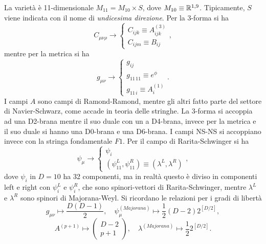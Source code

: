 La varietà è 11-dimensionale $M_{11} = M_{10} \times S$, dove $M_{10} \equiv \mathbb{R}^{1,9}$. Tipicamente, $S$ viene indicata con il nome di \emph{undicesima direzione}. Per la 3-forma si ha
\begin{equation}
    C_{\mu\nu\rho} \to 
    \begin{cases}
        C_{ijk} \equiv A_{ijk}^{(3)} \\
        C_{ijm} \equiv B_{ij}
    \end{cases},
\end{equation}
mentre per la metrica si ha
\begin{equation}
    g_{\mu\nu} \to 
    \begin{cases}
        g_{ij} \\
        g_{11\,11} \equiv e^{\phi} \\
        g_{11\,i} \equiv A_i^{(1)}
    \end{cases}.
\end{equation}
I campi $A$ sono campi di Ramond-Ramond, mentre gli altri fatto parte del settore di Navier-Schwarz, come accade in teoria delle stringhe. La 3-forma si accoppia ad una D2-brana mentre il suo duale con un a D4-brana, invece per la metrica e il suo duale si hanno una D0-brana e una D6-brana. I campi NS-NS si accoppiano invece con la stringa fondamentale $F1$. Per il campo di Rarita-Schwinger si ha 
\begin{equation}
    \psi_\mu \to 
    \begin{cases}
        \psi_i \\
        (\psi_{11}^L,\psi_{11}^R) \equiv (\lambda^L,\lambda^R)
    \end{cases},
\end{equation}
dove $\psi_i$ in $D = 10$ ha 32 componenti, ma in realtà questo è diviso in componenti left e right con $\psi_i^L$ e $\psi_i^R$, che sono spinori-vettori di Rarita-Schwinger, mentre $\lambda^L$ e $\lambda^R$ sono spinori di Majorana-Weyl. Si ricordano le relazioni per i gradi di libertà 
\begin{equation}
    g_{\mu\nu} \mapsto \frac{D(D - 1)}{2},\quad \psi_\mu^{(Majorana)} \mapsto \frac{1}{2}(D - 2)2^{[D/2]},
\end{equation}
\begin{equation}
    A^{(p + 1)} \mapsto 
    \begin{pmatrix}
        D - 2 \\
        p + 1    
    \end{pmatrix},\quad  
    \lambda^{(Majorana)} \mapsto \frac{1}{2}2^{[D/2]}.
\end{equation}
